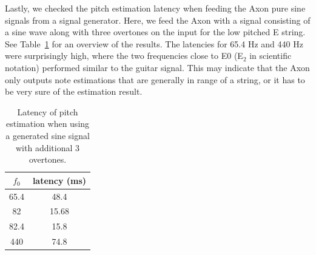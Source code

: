 \documentclass[a4paper,10pt,twocolumn]{article}
\newcommand{\note}[2]{#1${}_{#2}$}
\begin{document}
Lastly, we checked the pitch estimation latency when feeding the Axon pure sine signals from a signal generator. Here, we feed the Axon with a signal consisting of a sine wave along with three overtones on the input for the low pitched E string. See Table~\ref{tab:osc_siggen} for an overview of the results. The latencies for 65.4 Hz and 440 Hz were surprisingly high, where the two frequencies close to E0 (\note{E}{2} in scientific notation) performed similar to the guitar signal. This may indicate that the Axon only outputs note estimations that are generally in range of a string, or it has to be very sure of the estimation result.
\begin{table}[h]
    \centering
    \begin{tabular}{c|c}
        $f_0$ & latency (ms) \\
        \hline
        65.4 & 48.4 \\
        82   & 15.68 \\
        82.4 & 15.8 \\
        440  & 74.8
    \end{tabular}
    \caption{Latency of pitch estimation when using a generated sine signal with additional 3 overtones.}
    \label{tab:osc_siggen}
\end{table}




\end{document}
